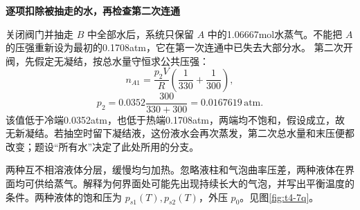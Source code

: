 \begin{solution}
{\begin{tikzpicture}
\end{tikzpicture}}



\par\medskip{}\noindent\textbf{逐项扣除被抽走的水，再检查第二次连通}\par\nobreak
关闭阀门并抽走 $B$ 中全部水后，系统只保留 $A$ 中的1.06667mol水蒸气。不能把 $A$ 的压强重新设为最初的0.1708atm，它在第一次连通中已失去大部分水。
第二次开阀，先假定无凝结，按总水量守恒求公共压强：
\[n_{A1}=\frac{p_2V}{R}\left(\frac1{330}+\frac1{300}\right),\]
\[\boxed{p_2=0.0352\frac{300}{330+300}=0.0167619\,\mathrm{atm}}.\]
该值低于冷端0.0352atm，也低于热端0.1708atm，两端均不饱和，假设成立，故 $\boxed{\text{无新凝结}}$。若抽空时留下凝结液，这份液水会再次蒸发，第二次总水量和末压便都改变；题设“所有水”决定了此处所用的分支。
\end{solution}
\par\medskip\noindent\begin{minipage}{\textwidth}
\begin{example}[互不相溶液体的界面沸腾]\label{t4-7}
两种互不相溶液体分层，缓慢均匀加热。忽略液柱和气泡曲率压差，两种液体在界面均可供给蒸气。解释为何界面处可能先出现持续长大的气泡，并写出平衡温度的条件。两种液体的饱和压为 $p_{s1}(T),p_{s2}(T)$，外压 $p_0$。见图\ref{fig:t4-7q}。
\end{example}
\end{minipage}
